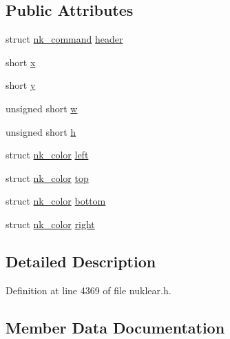 \subsection*{Public Attributes}
\begin{DoxyCompactItemize}
\item 
struct \mbox{\hyperlink{structnk__command}{nk\+\_\+command}} \mbox{\hyperlink{structnk__command__rect__multi__color_a00aa4e65f829de4f4462e92f9772f5f4}{header}}
\item 
short \mbox{\hyperlink{structnk__command__rect__multi__color_ae0ac34d18501f6fd6acd335ccb1a83df}{x}}
\item 
short \mbox{\hyperlink{structnk__command__rect__multi__color_aa1d244d6076653c43109ab1e45c197e3}{y}}
\item 
unsigned short \mbox{\hyperlink{structnk__command__rect__multi__color_af359df4ff0853bd61d10ac00bc8e34c3}{w}}
\item 
unsigned short \mbox{\hyperlink{structnk__command__rect__multi__color_abaea460479c699b2766b4d95d1d94811}{h}}
\item 
struct \mbox{\hyperlink{structnk__color}{nk\+\_\+color}} \mbox{\hyperlink{structnk__command__rect__multi__color_a6553b421a549546420de5f2afd565e57}{left}}
\item 
struct \mbox{\hyperlink{structnk__color}{nk\+\_\+color}} \mbox{\hyperlink{structnk__command__rect__multi__color_a3cb10db3ee61b9db8e4818fb09ceee0b}{top}}
\item 
struct \mbox{\hyperlink{structnk__color}{nk\+\_\+color}} \mbox{\hyperlink{structnk__command__rect__multi__color_ad45d7eed36c7f030afd6831189e5bed0}{bottom}}
\item 
struct \mbox{\hyperlink{structnk__color}{nk\+\_\+color}} \mbox{\hyperlink{structnk__command__rect__multi__color_a991243abaf14d0bc794e45cdf2148115}{right}}
\end{DoxyCompactItemize}


\subsection{Detailed Description}


Definition at line 4369 of file nuklear.\+h.



\subsection{Member Data Documentation}
\mbox{\label{structnk__command__rect__multi__color_ad45d7eed36c7f030afd6831189e5bed0}} 
